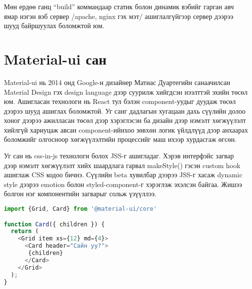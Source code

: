 Мөн ердөө ганц “build” коммандаар статик болон динамик вэбийг гарган авч ямар нэгэн вэб сервер /apache, nginx гэх мэт/ ашиглалгүйгээр сервер дээрээ шууд байршуулах боломжтой юм.

\section{Material-ui сан}
Material-ui нь 2014 онд Google-н дизайнер Матиас Дуартегийн санаачилсан Material Design гэх design language дээр суурилж хийгдсэн нээлттэй эхийн төсөл юм. Ашигласан технологи нь React тул бэлэн component-уудыг дуудаж төсөл дээрээ шууд ашиглах боломжтой. Уг санг дадлагын хугацаан дахь сүүлийн долоо хоног дээрээ ажилласан төсөл дээр хэрэглэсэн ба дизайн дээр нэмэлт хөгжүүлэлт хийлгүй хариуцаж авсан component-ийнхоо зөвхөн логик үйлдлүүд дээр анхаарах боломжийг олгосноор хөгжүүлэлтийн процессийг маш ихээр хурдасгаж өгсөн. 

Уг сан нь css-in-js технологи болох JSS-г ашигладаг. Хэрэв интерфэйс загвар дээр нэмэлт хөгжүүлэлт хийх шаардлага гарвал makeStyle() гэсэн custom hook ашиглаж CSS кодоо бичнэ. Сүүлийн beta хувилбар дээрээ JSS-г хасаж dynamic style дээрээ emotion болон styled-component-г хэрэглэж эхэлсэн байгаа. Жишээ болгон нэг компонентийн загварыг сольж үзүүллээ.

\begin{lstlisting}[language=Javascript, caption=Material-ui сангийн компонентыг ашиглаж буй байдал, frame=single]
import {Grid, Card} from '@material-ui/core'

function Card({ children }) {
  return (
    <Grid item xs={12} md={4}>
      <Card header="Сайн уу?">
       {children}
      </Card>
    </Grid>
  );
}
\end{lstlisting}
